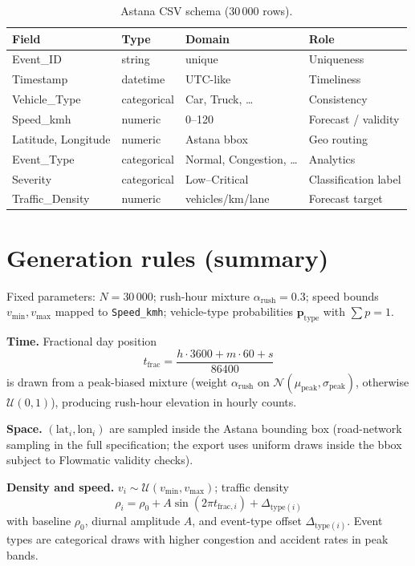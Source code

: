 \begin{table}[H]
  \centering
  \caption{Astana CSV schema (30\,000 rows).}
  \label{tab:astana-schema}
  \small
  \begin{tabular}{@{}llll@{}}
    \toprule
    \textbf{Field} & \textbf{Type} & \textbf{Domain} & \textbf{Role} \\
    \midrule
    Event\_ID & string & unique & Uniqueness \\
    Timestamp & datetime & UTC-like & Timeliness \\
    Vehicle\_Type & categorical & Car, Truck, \ldots & Consistency \\
    Speed\_kmh & numeric & 0--120 & Forecast / validity \\
    Latitude, Longitude & numeric & Astana bbox & Geo routing \\
    Event\_Type & categorical & Normal, Congestion, \ldots & Analytics \\
    Severity & categorical & Low--Critical & Classification label \\
    Traffic\_Density & numeric & vehicles/km/lane & Forecast target \\
    \bottomrule
  \end{tabular}
\end{table}

\section{Generation rules (summary)}

Fixed parameters: $N = 30\,000$; rush-hour mixture $\alpha_{\mathrm{rush}} = 0.3$; speed bounds $v_{\min}, v_{\max}$ mapped to \texttt{Speed\_kmh}; vehicle-type probabilities $\mathbf{p}_{\mathrm{type}}$ with $\sum p = 1$.

\textbf{Time.} Fractional day position
\begin{equation}
  t_{\mathrm{frac}} = \frac{h \cdot 3600 + m \cdot 60 + s}{86400}
\end{equation}
is drawn from a peak-biased mixture (weight $\alpha_{\mathrm{rush}}$ on $\mathcal{N}(\mu_{\mathrm{peak}}, \sigma_{\mathrm{peak}})$, otherwise $\mathcal{U}(0,1)$), producing rush-hour elevation in hourly counts.

\textbf{Space.} $(\mathrm{lat}_i, \mathrm{lon}_i)$ are sampled inside the Astana bounding box (road-network sampling in the full specification; the export uses uniform draws inside the bbox subject to Flowmatic validity checks).

\textbf{Density and speed.} $v_i \sim \mathcal{U}(v_{\min}, v_{\max})$; traffic density
\begin{equation}
  \rho_i = \rho_0 + A \sin(2\pi t_{\mathrm{frac},i}) + \Delta_{\mathrm{type}(i)}
\end{equation}
with baseline $\rho_0$, diurnal amplitude $A$, and event-type offset $\Delta_{\mathrm{type}(i)}$. Event types are categorical draws with higher congestion and accident rates in peak bands.

